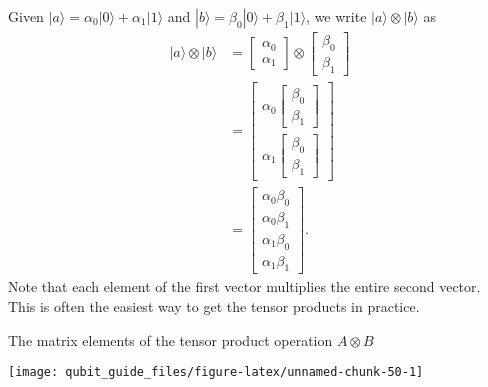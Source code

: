 \documentclass[fleqn]{article}
\begin{document}
Given \(|a\rangle = \alpha_0|0\rangle + \alpha_1|1\rangle\) and \(|b\rangle = \beta_0|0\rangle +\beta_1|1\rangle\), we write \(|a\rangle\otimes|b\rangle\) as
\[
  \begin{aligned}
    |a\rangle\otimes|b\rangle
    &= \begin{bmatrix}\alpha_0\\\alpha_1\end{bmatrix} \otimes \begin{bmatrix}\beta_0\\\beta_1\end{bmatrix}
  \\&= \begin{bmatrix}\alpha_0\begin{bmatrix}\beta_0\\\beta_1\end{bmatrix}\\\alpha_1\begin{bmatrix}\beta_0\\\beta_1\end{bmatrix}\end{bmatrix}
  \\&= \begin{bmatrix}\alpha_0\beta_0\\\alpha_0\beta_1\\\alpha_1\beta_0\\\alpha_1\beta_1\end{bmatrix}.
  \end{aligned}
\]
Note that each element of the first vector multiplies the entire second vector.
This is often the easiest way to get the tensor products in practice.

The matrix elements of the tensor product operation \(A\otimes B\)

\begin{center}\texttt{[image: qubit\_guide\_files/figure-latex/unnamed-chunk-50-1]} \end{center}
\end{document}
